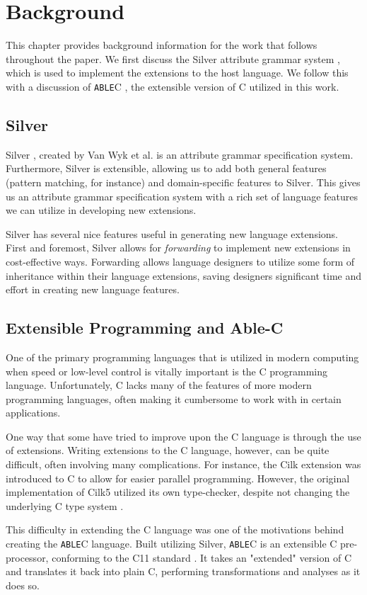 \documentclass[main.tex]{subfiles}
\begin{document}
\section{Background}

This chapter provides background information for the work that follows
throughout the paper. We first discuss the Silver attribute grammar system 
\cite{2}, which is used to implement the extensions to the host language.
We follow this with a discussion of \verb|ABLE|C \cite{7}, the extensible
version of C utilized in this work.

\subsection{Silver}
Silver \cite{2}, created by Van Wyk et al. is an attribute grammar
specification system. Furthermore, Silver is extensible, allowing us to add both
general features (pattern matching, for instance) and domain-specific features
to Silver. This gives us an attribute grammar specification system with a rich
set of language features we can utilize in developing new extensions. 

Silver has several nice features useful in generating new language extensions.
First and foremost, Silver allows for \emph{forwarding} \cite{3} to 
implement new extensions in cost-effective ways. Forwarding allows language
designers to utilize some form of inheritance within their language extensions,
saving designers significant time and effort in creating new language features.

\subsection{Extensible Programming and Able-C}
One of the primary programming languages that is utilized in modern computing
when speed or low-level control is vitally important is the C programming
language. Unfortunately, C lacks many of the features of more modern programming
languages, often making it cumbersome to work with in certain applications.

One way that some have tried to improve upon the C language is through the use
of extensions. Writing extensions to the C language, however, can be quite
difficult, often involving many complications. For instance, the Cilk extension
was introduced to C to allow for easier parallel programming. However, the
original implementation of Cilk5 utilized its own type-checker, despite not
changing the underlying C type system \cite{1, p.14}. 

This difficulty in extending the C language was one of the motivations behind
creating the \verb|ABLE|C language. Built utilizing Silver, \verb|ABLE|C is an 
extensible C pre-processor, conforming to the C11 standard \cite{7}. It takes an
"extended" version of C and translates it back into plain C, performing
transformations and analyses as it does so.
\end{document}
